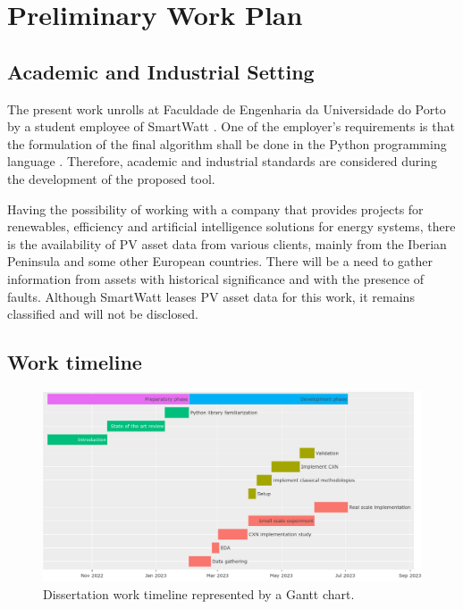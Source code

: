 \chapter{Preliminary Work Plan} \label{chap:chap3}

\section{Academic and Industrial Setting}
The present work unrolls at Faculdade de Engenharia da Universidade do Porto by a student employee of SmartWatt \cite{SW}. One of the employer's requirements is that the formulation of the final algorithm shall be done in the Python programming language \cite{Python}. Therefore, academic and industrial standards are considered during the development of the proposed tool.

Having the possibility of working with a company that provides projects for renewables, efficiency and artificial intelligence solutions for energy systems, there is the availability of PV asset data from various clients, mainly from the Iberian Peninsula and some other European countries. There will be a need to gather information from assets with historical significance and with the presence of faults. Although SmartWatt leases PV asset data for this work, it remains classified and will not be disclosed.

\section{Work timeline}

\begin{figure}[h!]
    \centering
    \includegraphics[width=\linewidth]{figures/chapter3/gantt.png} \caption{Dissertation work timeline represented by a Gantt chart.}
    \label{fig:gantt}
\end{figure}

